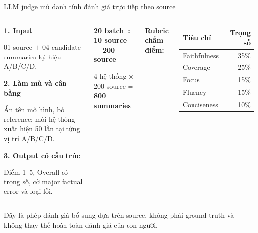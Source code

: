 \documentclass[aspectratio=169,10pt]{beamer}
\begin{document}
\begin{frame}{LLM judge mù danh tính đánh giá trực tiếp theo source}
  \begin{columns}[T,onlytextwidth]
      \begin{softbox}
        \footnotesize
        \textbf{1. Input}\par
        01 source $+$ 04 candidate summaries ký hiệu A/B/C/D.
        \vspace{1.2mm}\par
        \textbf{2. Làm mù và cân bằng}\par
        Ẩn tên mô hình, bỏ reference; mỗi hệ thống xuất hiện 50 lần tại từng vị trí A/B/C/D.
        \vspace{1.2mm}\par
        \textbf{3. Output có cấu trúc}\par
        Điểm 1--5, Overall có trọng số, cờ major factual error và loại lỗi.
      \end{softbox}

      \vspace{1.5mm}
      \begin{greenbox}
        \centering\footnotesize
        \textbf{20 batch $\times$ 10 source = 200 source}\par
        4 hệ thống $\times$ 200 source = \textbf{800 summaries}
      \end{greenbox}

      \textbf{Rubric chấm điểm:}
      \vspace{1mm}
      \renewcommand{\arraystretch}{1.32}
      \begin{tabularx}{\linewidth}{Xr}
        \toprule
        \textbf{Tiêu chí} & \textbf{Trọng số}\\
        \midrule
        Faithfulness                  & 35\%\\
        Coverage                      & 25\%\\
        Focus                         & 15\%\\
        Fluency                       & 15\%\\
        Conciseness                   & 10\%\\
        \bottomrule
      \end{tabularx}
  \end{columns}

  \vspace{1mm}
  \begin{keymessage}
    \scriptsize Đây là phép đánh giá bổ sung dựa trên source, không phải ground truth và không thay thế hoàn toàn đánh giá của con người.
  \end{keymessage}
\end{frame}
\end{document}
